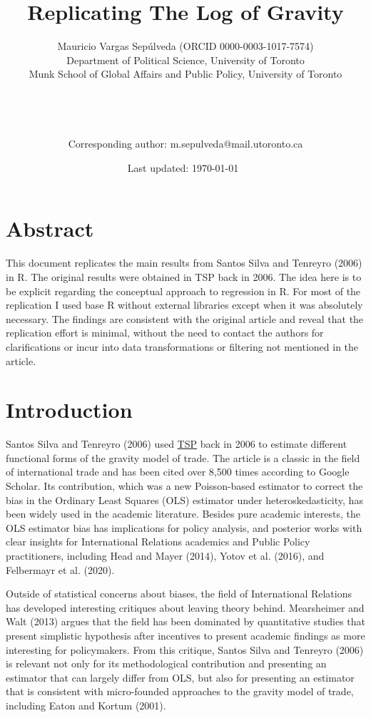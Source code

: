 \documentclass[12pt]{article}
\author{
  Mauricio Vargas Sepúlveda (ORCID 0000-0003-1017-7574)\\Department of
Political Science, University of Toronto\\Munk School of Global Affairs
and Public Policy, University of Toronto\\
  \smallskip\\
  \\\\
  \smallskip\\
  Corresponding author: m.sepulveda@mail.utoronto.ca
}
\title{Replicating The Log of Gravity}
\date{Last updated: \today\ \currenttime}
\begin{document}
\maketitle


\thispagestyle{empty}
\tableofcontents
\setcounter{page}{0}
\clearpage

\afterpage{\setlength\parskip{10pt}}

\section{Abstract}\label{abstract}

This document replicates the main results from Santos Silva and Tenreyro
(2006) in R. The original results were obtained in TSP back in 2006. The
idea here is to be explicit regarding the conceptual approach to
regression in R. For most of the replication I used base R without
external libraries except when it was absolutely necessary. The findings
are consistent with the original article and reveal that the replication
effort is minimal, without the need to contact the authors for
clarifications or incur into data transformations or filtering not
mentioned in the article.

\section{Introduction}\label{introduction}

Santos Silva and Tenreyro (2006) used
\href{https://en.wikipedia.org/wiki/TSP_(econometrics_software)}{TSP}
back in 2006 to estimate different functional forms of the gravity model
of trade. The article is a classic in the field of international trade
and has been cited over 8,500 times according to Google Scholar. Its
contribution, which was a new Poisson-based estimator to correct the
bias in the Ordinary Least Squares (OLS) estimator under
heteroskedasticity, has been widely used in the academic literature.
Besides pure academic interests, the OLS estimator bias has implications
for policy analysis, and posterior works with clear insights for
International Relations academics and Public Policy practitioners,
including Head and Mayer (2014), Yotov et al. (2016), and Felbermayr et
al. (2020).

Outside of statistical concerns about biases, the field of International
Relations has developed interesting critiques about leaving theory
behind. Mearsheimer and Walt (2013) argues that the field has been
dominated by quantitative studies that present simplistic hypothesis
after incentives to present academic findings as more interesting for
policymakers. From this critique, Santos Silva and Tenreyro (2006) is
relevant not only for its methodological contribution and presenting an
estimator that can largely differ from OLS, but also for presenting an
estimator that is consistent with micro-founded approaches to the
gravity model of trade, including Eaton and Kortum (2001).
\end{document}
